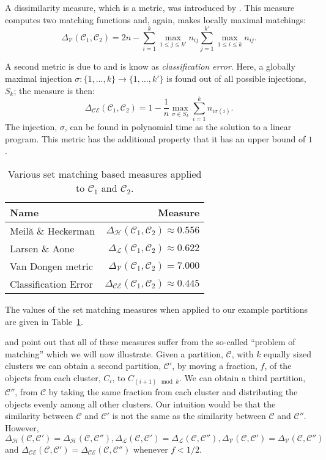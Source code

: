 \documentclass[a4paper]{report}
\newcommand{\clus}{\mathcal{C}}
\newcommand{\partcompare}[1]{\Delta_{\mathcal{#1}}(\clus_1,\clus_2)}
\newcommand{\partcomparep}[1]{\Delta_{\mathcal{#1}}(\clus,\clus')}
\newcommand{\partcomparepp}[1]{\Delta_{\mathcal{#1}}(\clus,\clus'')}
\begin{document}
A dissimilarity measure, which is a metric, was introduced by
\citet{van-dongen-2000}.  This measure computes two matching functions and,
again, makes locally maximal matchings:
\begin{equation*}
  \partcompare{V} = 2n - \sum_{i=1}^{k} \max_{1 \leq j \leq k'} n_{ij}
                         \sum_{j=1}^{k'} \max_{1 \leq i \leq k} n_{ij}.
\end{equation*}

A second metric is due to \citet{meila-2005} and is know as
\textit{classification error}.  Here, a globally maximal injection $\sigma
\colon \{1,\dotsc,k\} \to \{1,\dotsc,k'\}$ is found out of all possible
injections, $S_k$; the measure is then:
\begin{equation*}
  \partcompare{CE} = 1 - \frac{1}{n} \max_{\sigma \in S_k}
                                     \sum_{i=1}^{k} n_{i \sigma(i)}.
\end{equation*}
The injection, $\sigma$, can be found in polynomial time as the solution to a
linear program.  This metric has the additional property that it has an upper
bound of $1$.

\begin{table}
  \centering
  \begin{tabular}{lr}
    \toprule
    Name & Measure \\
    \midrule
    Meilă \& Heckerman   & $\partcompare{H} \approx 0.556$ \\
    Larsen \& Aone       & $\partcompare{L} \approx 0.622$ \\
    Van Dongen metric    & $\partcompare{V} = 7.000$ \\
    Classification Error & $\partcompare{CE} \approx 0.445$ \\
    
    \bottomrule
  \end{tabular}
  \caption{Various set matching based measures applied to $\clus_1$ and $\clus_2$.}
  \label{tab:set-matching-comparison}
\end{table}

The values of the set matching measures when applied to our example partitions
are given in Table~\ref{tab:set-matching-comparison}.

\citet{meila-2007} and \citet{bae2010comparison} point out that all of these
measures suffer from the so-called ``problem of matching'' which we will now
illustrate.  Given a partition, $\clus$, with $k$ equally sized clusters we
can obtain a second partition, $\clus'$, by moving a fraction, $f$, of the
objects from each cluster, $C_{i}$, to $C_{(i+1) \mod k}$.  We can obtain a
third partition, $\clus''$, from $\clus$ by taking the same fraction from each
cluster and distributing the objects evenly among all other clusters.  Our
intuition would be that the similarity between $\clus$ and $\clus'$ is not the
same as the similarity between $\clus$ and $\clus''$.  However,
$\partcomparep{H} = \partcomparepp{H}, \partcomparep{L}
= \partcomparepp{L}, \partcomparep{V} = \partcomparepp{V}$ and
$\partcomparep{CE} = \partcomparepp{CE}$ whenever $f < 1/2$.
\end{document}
